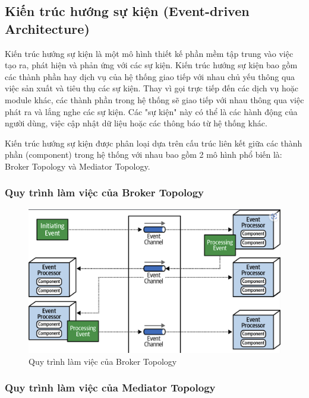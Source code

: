 \subsection{Kiến trúc hướng sự kiện (Event-driven Architecture)}

Kiến trúc hướng sự kiện là một mô hình thiết kế phần mềm tập trung vào việc tạo ra, phát hiện và phản ứng với các sự kiện. Kiến trúc hướng sự kiện bao gồm các thành phần hay dịch vụ của hệ thống giao tiếp với nhau chủ yếu thông qua việc sản xuất và tiêu thụ các sự kiện. Thay vì gọi trực tiếp đến các dịch vụ hoặc module khác, các thành phần trong hệ thống sẽ giao tiếp với nhau thông qua việc phát ra và lắng nghe các sự kiện. Các "sự kiện" này có thể là các hành động của người dùng, việc cập nhật dữ liệu hoặc các thông báo từ hệ thống khác.

Kiến trúc hướng sự kiện được phân loại dựa trên cấu trúc liên kết giữa các thành phần (component) trong hệ thống với nhau bao gồm 2 mô hình phổ biến là: Broker Topology và Mediator Topology.

\subsubsection{Quy trình làm việc của Broker Topology}

\begin{figure}[htp!]

	\centering
    \includegraphics[scale=0.3]{img/Broker_Topology.png}
    \caption{Quy trình làm việc của Broker Topology}
\end{figure}


\subsubsection{Quy trình làm việc của Mediator Topology}

